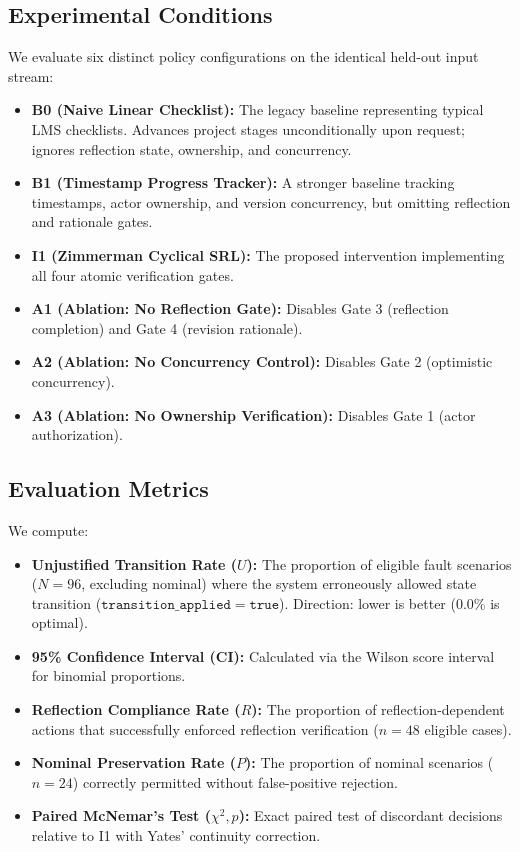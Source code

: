 \documentclass[11pt,a4paper]{article}
\begin{document}
\subsection{Experimental Conditions}
We evaluate six distinct policy configurations on the identical held-out input stream:
\begin{itemize}
    \item \textbf{B0 (Naive Linear Checklist):} The legacy baseline representing typical LMS checklists. Advances project stages unconditionally upon request; ignores reflection state, ownership, and concurrency.
    \item \textbf{B1 (Timestamp Progress Tracker):} A stronger baseline tracking timestamps, actor ownership, and version concurrency, but omitting reflection and rationale gates.
    \item \textbf{I1 (Zimmerman Cyclical SRL):} The proposed intervention implementing all four atomic verification gates.
    \item \textbf{A1 (Ablation: No Reflection Gate):} Disables Gate 3 (reflection completion) and Gate 4 (revision rationale).
    \item \textbf{A2 (Ablation: No Concurrency Control):} Disables Gate 2 (optimistic concurrency).
    \item \textbf{A3 (Ablation: No Ownership Verification):} Disables Gate 1 (actor authorization).
\end{itemize}

\subsection{Evaluation Metrics}
We compute:
\begin{itemize}
    \item \textbf{Unjustified Transition Rate ($U$):} The proportion of eligible fault scenarios ($N=96$, excluding nominal) where the system erroneously allowed state transition ($\mathtt{transition\_applied} = \mathtt{true}$). Direction: lower is better (0.0\% is optimal).
    \item \textbf{95\% Confidence Interval (CI):} Calculated via the Wilson score interval for binomial proportions.
    \item \textbf{Reflection Compliance Rate ($R$):} The proportion of reflection-dependent actions that successfully enforced reflection verification ($n=48$ eligible cases).
    \item \textbf{Nominal Preservation Rate ($P$):} The proportion of nominal scenarios ($n=24$) correctly permitted without false-positive rejection.
    \item \textbf{Paired McNemar's Test ($\chi^2, p$):} Exact paired test of discordant decisions relative to I1 with Yates' continuity correction.
\end{itemize}
\end{document}
